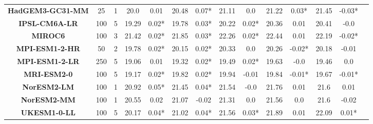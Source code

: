 \begin{tabular}{|c|c|c|c|c|c|c|c|c|c|c|c|c|c|}
\textbf{HadGEM3-GC31-MM } &   25 &      1 &   20.0 &   0.01 &  20.48 &  0.07* &  21.11 &     0.0 &  21.22 &   0.03* &  21.45 &  -0.03* \\
\textbf{IPSL-CM6A-LR    } &  100 &      5 &  19.29 &  0.02* &  19.78 &  0.03* &  20.22 &   0.02* &  20.36 &    0.01 &  20.41 &    -0.0 \\
\textbf{MIROC6          } &  100 &      3 &  21.42 &  0.02* &  21.85 &  0.03* &  22.26 &   0.02* &  22.44 &    0.01 &  22.19 &  -0.02* \\
\textbf{MPI-ESM1-2-HR   } &   50 &      2 &  19.78 &  0.02* &  20.15 &  0.02* &  20.33 &     0.0 &  20.26 &  -0.02* &  20.18 &   -0.01 \\
\textbf{MPI-ESM1-2-LR   } &  250 &      5 &  19.06 &   0.01 &  19.32 &  0.02* &  19.49 &   0.02* &  19.63 &    -0.0 &  19.46 &     0.0 \\
\textbf{MRI-ESM2-0      } &  100 &      5 &  19.17 &  0.02* &  19.82 &  0.02* &  19.94 &   -0.01 &  19.84 &  -0.01* &  19.67 &  -0.01* \\
\textbf{NorESM2-LM      } &  100 &      1 &  20.92 &  0.05* &  21.45 &  0.04* &  21.54 &    -0.0 &  21.76 &    0.01 &   21.6 &    0.01 \\
\textbf{NorESM2-MM      } &  100 &      1 &  20.55 &   0.02 &  21.07 &  -0.02 &  21.31 &     0.0 &  21.56 &     0.0 &   21.6 &   -0.02 \\
\textbf{UKESM1-0-LL     } &  100 &      5 &  20.17 &  0.04* &  21.02 &  0.04* &  21.56 &   0.03* &  21.89 &    0.01 &  22.09 &   0.01* \\
\bottomrule
\end{tabular}
